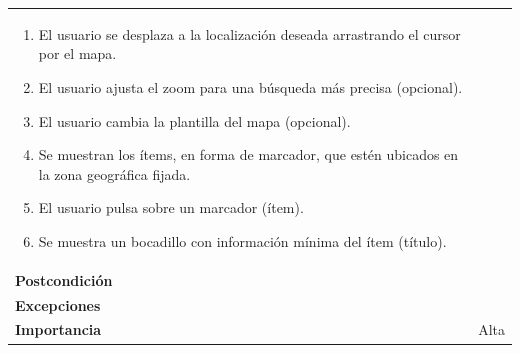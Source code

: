 \documentclass[
]{article}
\providecommand{\tightlist}{%
  \setlength{\itemsep}{0pt}\setlength{\parskip}{0pt}}
\begin{document}
\begin{longtable}[]{@{}ll@{}}
\begin{minipage}[t]{0.74\columnwidth}
\begin{enumerate}
\def\labelenumi{\arabic{enumi}.}
\tightlist
\item
  El usuario se desplaza a la localización deseada arrastrando el cursor
  por el mapa.
\item
  El usuario ajusta el zoom para una búsqueda más precisa (opcional).
\item
  El usuario cambia la plantilla del mapa (opcional).
\item
  Se muestran los ítems, en forma de marcador, que estén ubicados en la
  zona geográfica fijada.
\item
  El usuario pulsa sobre un marcador (ítem).
\item
  Se muestra un bocadillo con información mínima del ítem (título).
\end{enumerate}\strut
\end{minipage}\tabularnewline
\begin{minipage}[t]{0.20\columnwidth}\raggedright
\textbf{Postcondición}\strut
\end{minipage} & \begin{minipage}[t]{0.74\columnwidth}\raggedright
\strut
\end{minipage}\tabularnewline
\begin{minipage}[t]{0.20\columnwidth}\raggedright
\textbf{Excepciones}\strut
\end{minipage} & \begin{minipage}[t]{0.74\columnwidth}\raggedright
\strut
\end{minipage}\tabularnewline
\begin{minipage}[t]{0.20\columnwidth}\raggedright
\textbf{Importancia}\strut
\end{minipage} & \begin{minipage}[t]{0.74\columnwidth}\raggedright
Alta\strut
\end{minipage}\tabularnewline
\bottomrule
\end{longtable}
\end{document}
